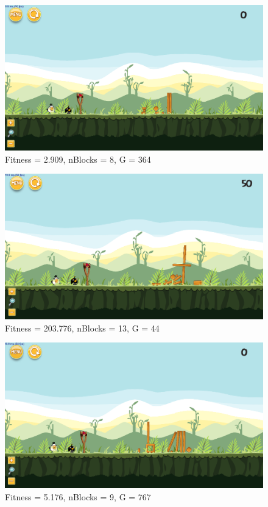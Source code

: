 \begin{figure}[H]
	\centering
	\includegraphics[scale=0.35]{gfx/e2/level-0-base_large180525_034217.png}
	\caption{Fitness = 2.909, nBlocks = 8, G = 364 }\label{f:e2-2}
\end{figure}

\begin{figure}[H]
	\centering
	\includegraphics[scale=0.35]{gfx/e2/level-0-base_large180529_221751.png}
	\caption{Fitness = 203.776, nBlocks = 13, G = 44 }\label{f:e2-3}
\end{figure}

\begin{figure}[H]
	\centering
	\includegraphics[scale=0.35]{gfx/e2/level-0-base_large180529_223045.png}
	\caption{Fitness = 5.176, nBlocks = 9, G = 767  }\label{f:e2-4}
\end{figure}


